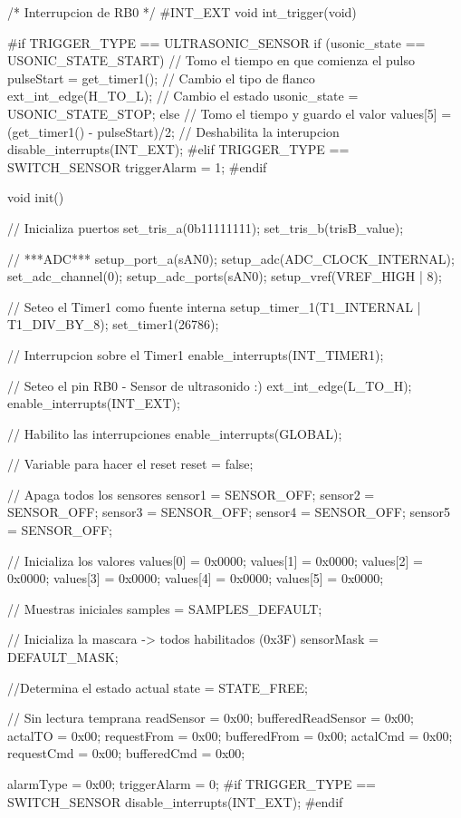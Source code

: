 {\begin{verbatimtab}
/* Interrupcion de RB0 */
#INT_EXT
void int_trigger(void)
{
#if TRIGGER_TYPE == ULTRASONIC_SENSOR
	if (usonic_state == USONIC_STATE_START)
	{
		// Tomo el tiempo en que comienza el pulso
		pulseStart = get_timer1();
		// Cambio el tipo de flanco
		ext_int_edge(H_TO_L);
		// Cambio el estado
		usonic_state = USONIC_STATE_STOP;
	} else {
		// Tomo el tiempo y guardo el valor
		values[5] = (get_timer1() - pulseStart)/2;
		// Deshabilita la interupcion
		disable_interrupts(INT_EXT);
	}
#elif TRIGGER_TYPE == SWITCH_SENSOR
	triggerAlarm = 1;
#endif


}

void init()
{
	// Inicializa puertos
	set_tris_a(0b11111111);
	set_tris_b(trisB_value);

	// ***ADC***
	setup_port_a(sAN0);
	setup_adc(ADC_CLOCK_INTERNAL);
	set_adc_channel(0);
	setup_adc_ports(sAN0);
	setup_vref(VREF_HIGH | 8);
	
	// Seteo el Timer1 como fuente interna
	setup_timer_1(T1_INTERNAL | T1_DIV_BY_8);
	set_timer1(26786);
	
	// Interrupcion sobre el Timer1
	enable_interrupts(INT_TIMER1);

	// Seteo el pin RB0 - Sensor de ultrasonido :)
	ext_int_edge(L_TO_H);
	enable_interrupts(INT_EXT);

	// Habilito las interrupciones
	enable_interrupts(GLOBAL);
	
	// Variable para hacer el reset
	reset = false;

	// Apaga todos los sensores
	sensor1 = SENSOR_OFF;
	sensor2 = SENSOR_OFF;
	sensor3 = SENSOR_OFF;
	sensor4 = SENSOR_OFF;
	sensor5 = SENSOR_OFF;

	// Inicializa los valores
	values[0] = 0x0000;
	values[1] = 0x0000;
	values[2] = 0x0000;
	values[3] = 0x0000;
	values[4] = 0x0000;
	values[5] = 0x0000;

	// Muestras iniciales
	samples = SAMPLES_DEFAULT;
	
	// Inicializa la mascara -> todos habilitados (0x3F)
	sensorMask = DEFAULT_MASK;
	
	//Determina el estado actual
	state = STATE_FREE;
	
	// Sin lectura temprana
	readSensor = 0x00;
	bufferedReadSensor = 0x00;
	actalTO = 0x00;
	requestFrom = 0x00;
	bufferedFrom = 0x00;
	actalCmd = 0x00;
	requestCmd = 0x00;
	bufferedCmd = 0x00;

	alarmType = 0x00;
	triggerAlarm = 0;
#if TRIGGER_TYPE == SWITCH_SENSOR
	disable_interrupts(INT_EXT);
#endif

}
\end{verbatimtab}}
